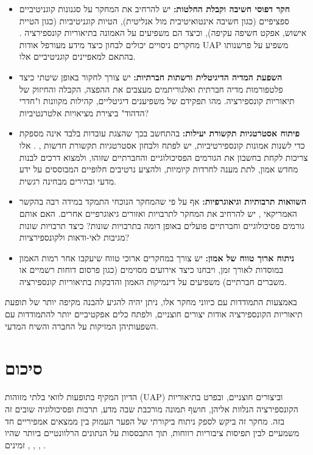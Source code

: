\documentclass[12pt,a4paper]{article}
\begin{document}
\begin{itemize}
    \item \textbf{חקר דפוסי חשיבה וקבלת החלטות:} יש להרחיב את המחקר על סגנונות קוגניטיביים ספציפיים (כגון חשיבה אינטואיטיבית מול אנליטית), הטיות קוגניטיביות (כגון הטיית אישוש, אפקט חשיפה עקיפה), וכיצד הם משפיעים על האמונה בתיאוריות קונספירציה \cite{biddlestone2025conspiracy}. מחקרים ניסויים יכולים לבחון כיצד מידע מעורפל אודות UAP משפיע על פרשנותו בהתאם למאפיינים קוגניטיביים אלו.
    \item \textbf{השפעת המדיה הדיגיטלית ורשתות חברתיות:} יש צורך לחקור באופן שיטתי כיצד פלטפורמות מדיה חברתית ואלגוריתמים מעצבים את ההפצה, הקבלה והחיזוק של תיאוריות קונספירציה. מהו תפקידם של משפיענים דיגיטליים, קהילות מקוונות ו"חדרי הדהוד" ביצירת מציאויות אלטרנטיביות?
    \item \textbf{פיתוח אסטרטגיות תקשורת יעילות:} בהתחשב בכך שהצגת עובדות בלבד אינה מספקת כדי לשנות אמונות קונספירטיביות, יש לפתח ולבחון אסטרטגיות תקשורת חדשות \cite{aaro2024misidentification}, \cite{wojcik2021cosmologies}. אלו צריכות לקחת בחשבון את הגורמים הפסיכולוגיים והחברתיים שזוהו, ולמצוא דרכים לבנות מחדש אמון, לתת מענה לחרדות קיומיות, ולהציע נרטיבים חלופיים המבוססים על ידע מדעי ובהירים מבחינה רגשית.
    \item \textbf{השוואות תרבותיות וגיאוגרפיות:} אף על פי שהמחקר הנוכחי התמקד במידה רבה בהקשר האמריקאי \cite{ellwood1999ufo}, יש להרחיב את המחקר לתרבויות ואזורים גיאוגרפיים אחרים. האם אותם גורמים פסיכולוגיים וחברתיים פועלים באופן דומה בתרבויות שונות? כיצד תרבויות שונות מגיבות לאי-ודאות ולקונספירציות?
    \item \textbf{ניתוח ארוך טווח של אמון:} יש צורך במחקרים ארוכי טווח שיעקבו אחר רמות האמון במוסדות לאורך זמן, ויבחנו כיצד אירועים מסוימים (כגון פרסום דוחות רשמיים או משברים חברתיים) משפיעים על דינמיקות האמון והדבקות בתיאוריות קונספירציה.
\end{itemize}

באמצעות התמודדות עם כיווני מחקר אלו, ניתן יהיה להגיע להבנה מקיפה יותר של תופעת תיאוריות הקונספירציה אודות יצורים חוצניים, ולפתח כלים אפקטיביים יותר להתמודדות עם השפעותיהן המזיקות על החברה והשיח המדעי.

\section{סיכום}

הדיון המקיף בתופעות לוואי בלתי מזוהות (UAP) וביצורים חוצניים, ובפרט בתיאוריות הקונספירציה הנלוות אליהן, חושף תמונה מורכבת שבה מדע, תרבות ופסיכולוגיה שובים זה בזה. מחקר זה ביקש לספק ניתוח ביקורתי של הפער העמוק בין ממצאים אמפיריים חד משמעיים לבין תפיסות ציבוריות רווחות, תוך התבססות על הנתונים הרלוונטיים ביותר שהיו זמינים \cite{aaro2024misidentification}, \cite{aaro2024noevidence}, \cite{wojcik2021cosmologies}, \cite{bowes2023conspiracy, biddlestone2025conspiracy, ellwood1999ufo}.
\end{document}
